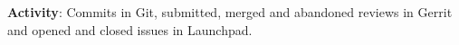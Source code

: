 \textbf{Activity}: Commits in Git, submitted, merged and abandoned reviews in Gerrit and opened and closed issues in Launchpad.
